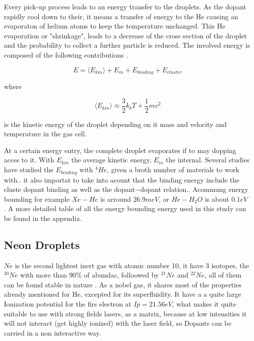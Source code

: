 Every pick-up process leads to an energy transfer to the droplets. As the dopant rapidly cool down to their, it means a transfer of energy to the He causing an  evaporaton of  helium atoms to keep the temperature unchanged. This He evaporation or "shrinkage", leads to a decrease of the cross section of the droplet and the probability to collect a further particle is  reduced. The involved energy is composed of the following contributions \cite{bunermann_modeling_2011}.

\begin{equation}
E=\langle E_{kin}\rangle + E_{in} + E_{binding} + E_{cluster}
\end{equation}

where

\begin{equation}
\langle E_{kin}\rangle \approx \dfrac{3}{2}k_{b}T + \dfrac{1}{2} m v^{2}
\end{equation}

is the kinetic energy of the droplet depending on it mass and velocity and temperature in the gas cell.

At a certain energy entry, the complete droplet evaporates if to may dopping acces to it. With $E_{kin}$ the average kinetic energy, $E_{in}$ the internal. Several studies have studied the $E_{binding}$ with $^{4}He$, given a broth number of materials to work with.. it also importat to take into acount that the binding energy include the cluste dopant binding as well as the dopant$-$dopant relation.\cite{toennies_spectroscopy_1998}. Acommung energy bounding for example $Xe-He$ is arround $26.9 meV$\cite{lewerenz_successive_1995}, or $He-H_{2}O$ is about $0.1 eV$ \cite{lewis_helium_2014}. A more detailed table of all the energy bounding energy used in this study can be found in the appendix.

\subsection{Neon Droplets}

$Ne$ is the second lightest inert gas with atomic number 10, it have 3 isotopes, the $^{20}Ne$ with more than $90\%$ of abundac, folloowed by $^{21}Ne$ and  $^{22}Ne$, all of them  can be found stable in nature \cite{meija_atomic_2016}. As a nobel gas, it shares most of the properties already mentioned for He, excepted  for its superfluidity.  It have a a quite large Ionization potential for the firs electron at $Ip=21.56 eV$, what makes it quite suitable to use with strong fields lasers, as a matrix, because at low intensities it will not interact (get highly ionized) with the laser field, so Dopants can be carried in a non interactive way.

